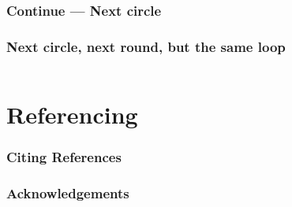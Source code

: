 \documentclass[en, 11pt, xcolor=dvipsnames]{beamer}
\begin{document}
\subsubsection{Continue --- Next circle}
\begin{frame}[fragile]
	\frametitle{Next circle, next round, but the same loop}

	\begin{columns}[c]
		\begin{column}{0.9\textwidth}


		\end{column}
	\end{columns}

\end{frame}


\QApage


\section{Referencing}

\begin{frame}
	\frametitle{Citing References}

	\bigskip %

\end{frame}


\begin{frame}
	\frametitle{Acknowledgements}

	\begin{columns}[t] %
		\begin{column}{0.45\textwidth} %
		\end{column}
		\begin{column}{0.5\textwidth} %
		\end{column}
	\end{columns}
\end{frame}
\end{document}
